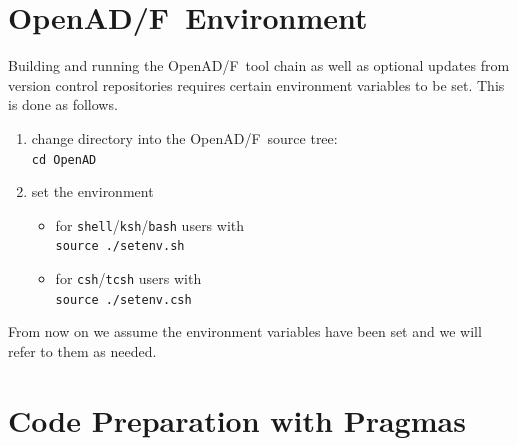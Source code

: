\documentclass{book}
\newcommand{\OpenADF}{OpenAD/F}
\begin{document}
\section{\OpenADF\ Environment}\label{sec:env}
Building and running the \OpenADF\  tool chain as well as optional updates from 
version control repositories requires certain environment variables to be set. 
This is done as follows.
\begin{enumerate}
\item change directory into the \OpenADF\ source tree:\\
\lstinline{cd OpenAD}
\item set the environment 
\begin{itemize}
\item for \lstinline{shell}/\lstinline{ksh}/\lstinline{bash} users with\\
\lstinline{source ./setenv.sh}
\item for \lstinline{csh}/\lstinline{tcsh} users with\\
\lstinline{source ./setenv.csh}
\end{itemize}
\end{enumerate}
From now on we assume the environment variables have been set and we will refer 
to them as needed.  

\section{Code Preparation with Pragmas} \label{sec:pragmas}
\end{document}
